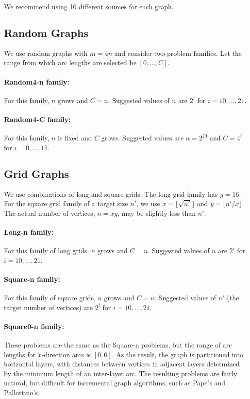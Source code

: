 \documentclass[11pt]{article}
\begin{document}
We recommend using 10 different sources for each graph.

\subsection{Random Graphs}
We use random graphs with $m = 4n$ and consider two problem families.
Let the range from which arc lengths are selected be $[0, \ldots, C]$.

\paragraph{Random4-n family:}
For this family, $n$ grows and $C=n$.
Suggested values of $n$ are $2^i$ for $i = 10, \ldots, 21$.

\paragraph{Random4-C family:} For this family, $n$ is fixed and $C$ grows.
Suggested values are $n = 2^{20}$ and $C = 4^i$ for $i = 0, \ldots, 15$.

\subsection{Grid Graphs}

We use combinations of long and square grids.
The long grid family has $y=16$.
For the square grid family of a target size $n'$, we
use $x = \lfloor \sqrt {n'} \rfloor$ and
$y = \lfloor {n'/x} \rfloor$.
The actual number of vertices, $n=xy$, may be slightly less than $n'$.

\paragraph{Long-n family:}
For this family of long grids, $n$ grows and $C=n$.
Suggested values of $n$ are $2^i$ for $i = 10, \ldots, 21$.

\paragraph{Square-n family:}
For this family of square grids, $n$ grows and $C=n$.
Suggested values of $n'$ (the target number of vertices)
are $2^i$ for $i = 10, \ldots, 21$.

\paragraph{Square0-n family:}
These problems are the same as the Square-n problems, but the range of
arc lengths for $x$-direction arcs is $[0,0]$.
As the result, the graph is partitioned into horizontal layers,
with distances between vertices in adjacent layers determined by the 
minimum length of an inter-layer arc.
The resulting problems are fairly natural, but difficult for
incremental graph algorithms, such as Pape's and Pallottino's.
\end{document}
